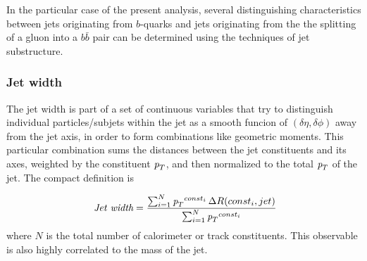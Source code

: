 

In the particular case of the present analysis, several distinguishing characteristics between jets originating from $b$-quarks and jets originating from the the splitting of a gluon into a $b\bar{b}$ pair can be determined using the techniques of jet substructure. 


\subsubsection{Jet width}


The jet width is part of a set of continuous variables that try to distinguish individual particles/subjets within the jet as a smooth funcion of $(\delta \eta, \delta \phi)$ away from the jet axis, in order to form combinations like geometric moments.  This particular combination sums the distances between the jet constituents and its axes, weighted by the constituent ${\emph{p}_{T}}$, and then normalized to the total ${\emph{p}_{T}}$ of the jet. The compact definition is 


\begin{equation} 
\mbox{ {\it Jet width}} = \frac{\sum_{i=1}^N {\emph{p}_{T}}^{const_i} \,\Delta R (const_i,jet) }{\sum_{i=1}^N {\emph{p}_{T}}^{const_i} }
\label{eqn:trackjetwidth}
\end{equation} 
where $N$ is the total number of calorimeter or track constituents.  This observable is also highly correlated to the mass of the jet.

